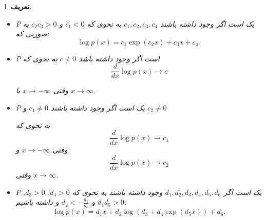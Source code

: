 \documentclass[a4paper,12pt]{article}
\newtheorem{den}{{\large\bf تعریف}}[section]
\begin{document}
\begin{den}
	\begin{itemize}
		فرض کنید $p$ چگالی احتمال یک توزیع پیوسته  $P$ باشد.
		\item 
		$P$
		یک 
		است اگر وجود داشته باشند
		$c_1, c_2, c_3, c_4$
		به نحوی که
		$c_1 <0$ 
		و
		$c_2c_3>0$
		به صورتی که:
		$$
		\log p(x) = c_1 \exp(c_2 x) + c_3 x + c_4.
		$$
		
		\item 
		$P$
		است اگر وجود داشته باشد
		$c \neq 0$
		به نحوی که
		$$
		\frac{d}{dx} \log p(x) \rightarrow c
		$$
		
		وقتی $x \rightarrow -\infty$ یا $x \rightarrow \infty$.
		
		\item 
		$P$
		یک
		است اگر وجود داشته باشند
		$c_1 \neq 0$ 
		و
		$c_2 \neq 0$ 
		
		به نحوی که
		$$
		\frac{d}{dx} \log p(x) \rightarrow c_1 
		$$
		وقتی 
		$x \rightarrow -\infty$ 
		و
		$$
		\frac{d}{dx} \log p(x) \rightarrow c_2 
		$$
		وقتی
		$x \rightarrow \infty$.
		\item 
		$P$
		یک 
		است اگر 
		$d_1, d_2, d_3, d_4, d_5, d_6$
		وجود داشته باشند به نحوی که
		$d_4 > 0$, $d_3 > 0$, $d_1 d_5 > 0$ و $d_2 < -\frac{d_1}{d_5}$ 
		و داشته باشیم:
		$$
		\log p(x) = d_1 x + d_2 \log(d_3 + d_4 \exp(d_5 x))+ d_6.
		$$
		
	\end{itemize} 
\end{den}
\end{document}
